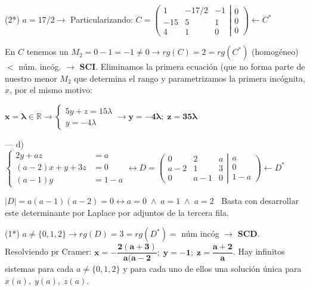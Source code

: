 \begin{proofw}
\noindent (2*) $a=17/2 \to $ Particularizando: $ C=\left( \begin{matrix}  1&-17/2&-1\\-15&\boxed{5}&\boxed{1}\\4&\boxed{1}&\boxed{0}      \end{matrix} \right|  \left.    \begin{matrix}   0\\0\\0 \end{matrix} \right) \leftarrow C^*$

\noindent En $C$ tenemos un $\boxed{M_2}=0-1=-1\neq 0 \to rg(C)=2=rg(C^*)$ (homogéneo) $<$ núm. incóg. $\to$ \textbf{SCI}. Eliminamos la primera ecuación (que no forma parte de nuestro menor $M_2$ que determina el rango y parametrizamos la primera incógnita, $x$, por el mismo motivo:

\noindent $\boldsymbol{x=\lambda} \in \mathbb R \to \begin{cases} 5y+z=15\lambda \\ y=-4\lambda \end{cases} \longrightarrow \boldsymbol{y=-4 \lambda}; \; \boldsymbol{z=35\lambda} $

\noindent --- d)\small{ $\begin{cases}  2y+az&=a\\(a-2)x+y+3z&=0\\(a-1)y&=1-a   \end{cases} \leftrightarrow D=\left( \begin{matrix}   0&2&a\\a-2&1&3\\0&a-1&0     \end{matrix} \right|  \left.    \begin{matrix}  a\\0\\1-a  \end{matrix} \right) \leftarrow D^*$}

\noindent \normalsize{$|D|=$}$a(a-1)(a-2)=0 \leftrightarrow a=0 \; \wedge \; a=1 \; \wedge \; a=2\;\;$ \textcolor{gris}{ Basta con desarrollar este determinante por Laplace por adjuntos de la tercera fila.}

\noindent (1*) $a\neq \{0,1,2\} \to rg(D)=3=rg(D^*)=$ núm incóg $\to$ \textbf{ SCD}. Resolviendo pr Cramer: $\boldsymbol{x=-\dfrac {2(a+3)}{a(a-2}; \; y=-1; \; z=\dfrac {a+2}{a}}$. Hay infinitos sistemas para cada $a\neq \{0,1,2\}$ y para cada uno de ellos una solución única para $x(a),\;  y(a),\;  z(a)$.


\end{proofw}
